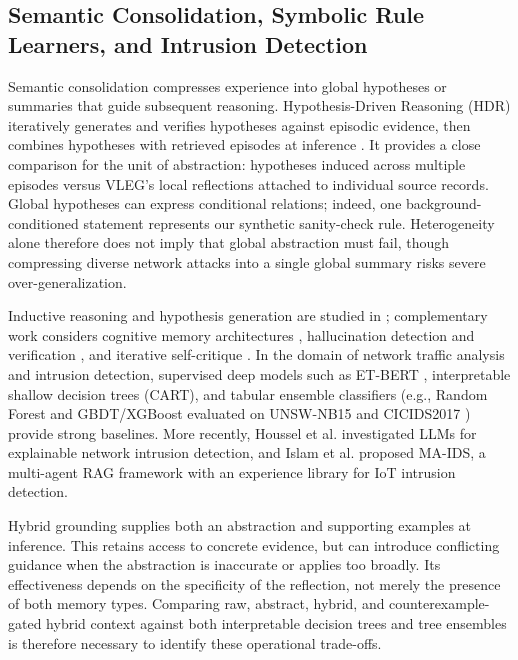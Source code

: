\documentclass[10pt,a4paper,onecolumn]{article}
\theoremstyle{definition}
\theoremstyle{remark}
\begin{document}
\subsection{Semantic Consolidation, Symbolic Rule Learners, and Intrusion Detection}
Semantic consolidation compresses experience into global hypotheses or summaries that guide subsequent reasoning. Hypothesis-Driven Reasoning (HDR) iteratively generates and verifies hypotheses against episodic evidence, then combines hypotheses with retrieved episodes at inference \cite{agarwal2026hypothesis}. It provides a close comparison for the unit of abstraction: hypotheses induced across multiple episodes versus VLEG's local reflections attached to individual source records. Global hypotheses can express conditional relations; indeed, one background-conditioned statement represents our synthetic sanity-check rule. Heterogeneity alone therefore does not imply that global abstraction must fail, though compressing diverse network attacks into a single global summary risks severe over-generalization.

Inductive reasoning and hypothesis generation are studied in \cite{he2024idea,kim2022playgrounds,lee2024generating,qiu2024phenomenal,zhou2024hypothesis}; complementary work considers cognitive memory architectures \cite{kim2023machine,li2024memory,wang2025mirix}, hallucination detection and verification \cite{manakul2023selfcheckgpt,dhuliawala2024chain}, and iterative self-critique \cite{madaan2023selfrefine,gou2024critic}. In the domain of network traffic analysis and intrusion detection, supervised deep models such as ET-BERT \cite{lin2022etbert}, interpretable shallow decision trees (CART), and tabular ensemble classifiers (e.g., Random Forest and GBDT/XGBoost evaluated on UNSW-NB15 \cite{moustafa2015unsw} and CICIDS2017 \cite{sharafaldin2018cicids}) provide strong baselines. More recently, Houssel et al. \cite{houssel2024explainable} investigated LLMs for explainable network intrusion detection, and Islam et al. \cite{islam2026maids} proposed MA-IDS, a multi-agent RAG framework with an experience library for IoT intrusion detection.

Hybrid grounding supplies both an abstraction and supporting examples at inference. This retains access to concrete evidence, but can introduce conflicting guidance when the abstraction is inaccurate or applies too broadly. Its effectiveness depends on the specificity of the reflection, not merely the presence of both memory types. Comparing raw, abstract, hybrid, and counterexample-gated hybrid context against both interpretable decision trees and tree ensembles is therefore necessary to identify these operational trade-offs.
\end{document}
